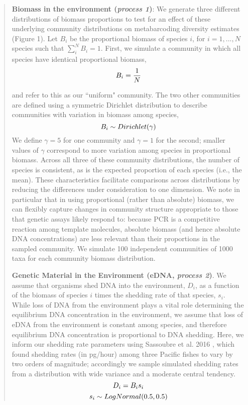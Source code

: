 \documentclass[fleqn,11pt,lineno]{wlscirep}
\begin{document}
\begin{quote}
\textbf{Biomass in the environment (\textit{process 1})}:
We generate three different distributions of biomass proportions to test for an effect of these underlying community distributions on metabarcoding diversity estimates (Figure 1). Let $B_{i}$ be the proportional biomass of species $i$, for $i=1,...,N$ species such that $\sum_{i}^{N} B_i = 1$.   
First, we simulate a community in which all species have identical proportional biomass,  
\begin{equation}
	$$B_i = \dfrac{1}{N}$$
\end{equation}
	
and refer to this as our ``uniform" community. The two other communities are defined using a symmetric Dirichlet distribution to describe communities with variation in biomass among species,
\begin{equation}
	$$B_i \sim Dirichlet(\gamma)$$	
	\end{equation}
We define $\gamma = 5$ for one community and $\gamma = 1$ for the second; smaller values of $\gamma$ correspond to more variation among species in proportional biomass. Across all  three of these community distributions, the number of species is consistent, as is the expected proportion of each species (i.e., the mean).  These characteristics facilitate comparisons across distributions by reducing the differences under consideration to one dimension.  We note in particular that in using proportional (rather than absolute) biomass, we can flexibly capture changes in community structure appropriate to those that genetic assays likely respond to: because PCR is a competitive reaction among template molecules, absolute biomass (and hence absolute DNA concentrations) are less relevant than their proportions in the sampled community.  We simulate 100 independent communities of 1000 taxa for each community biomass distribution.

\textbf{Genetic Material in the Environment (eDNA, \textit{process 2})}. We assume that organisms shed DNA into the environment, $D_{i}$, as a function of the biomass of species $i$ times the shedding rate of that species, $s_i$. While loss of DNA from the environment plays a vital role determining the equilibrium DNA concentration in the environment, we assume that loss of eDNA from the environment is constant among species, and therefore equilibrium DNA concentration is proportional to DNA shedding. Here, we inform our shedding rate parameters using Sassoubre et al. 2016 \cite{sassoubre2016quantification}, which found shedding rates (in pg/hour) among three Pacific fishes to vary by two orders of magnitude; accordingly we sample simulated shedding rates from a distribution with wide variance and a moderate central tendency. 
\begin{equation}
		$$D_{i} = B_{i}s_{i}$$ \\
\end{equation}		
\begin{equation}		
	$$s_i \sim LogNormal(0.5, 0.5)$$
\end{equation}	
		

\end{quote}
\end{document}
